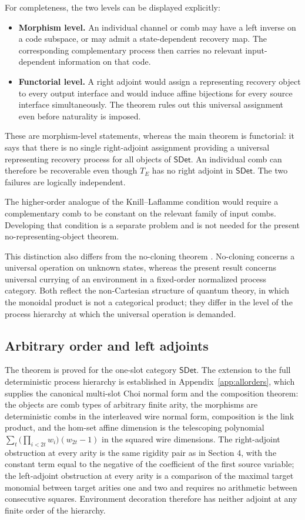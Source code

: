\documentclass[11pt,a4paper]{article}
\theoremstyle{definition}
\theoremstyle{plain}
\theoremstyle{remark}
\newcommand{\SDet}{\mathsf{SDet}}
\begin{document}
For completeness, the two levels can be displayed explicitly:
\begin{itemize}
\item \textbf{Morphism level.} An individual channel or comb may have a left inverse on a code subspace, or may admit a state-dependent recovery map. The corresponding complementary process then carries no relevant input-dependent information on that code.
\item \textbf{Functorial level.} A right adjoint would assign a representing recovery object to every output interface and would induce affine bijections for every source interface simultaneously. The theorem rules out this universal assignment even before naturality is imposed.
\end{itemize}

These are morphism-level statements, whereas the main theorem is functorial: it says that there is no single right-adjoint assignment providing a universal representing recovery process for all objects of $\SDet$. An individual comb can therefore be recoverable even though $T_E$ has no right adjoint in $\SDet$. The two failures are logically independent.

The higher-order analogue of the Knill--Laflamme condition would require a complementary comb to be constant on the relevant family of input combs. Developing that condition is a separate problem and is not needed for the present no-representing-object theorem.

This distinction also differs from the no-cloning theorem \cite{dieks1982,wootters1982}. No-cloning concerns a universal operation on unknown states, whereas the present result concerns universal currying of an environment in a fixed-order normalized process category. Both reflect the non-Cartesian structure of quantum theory, in which the monoidal product is not a categorical product; they differ in the level of the process hierarchy at which the universal operation is demanded.

\subsection{Arbitrary order and left adjoints}

The theorem is proved for the one-slot category $\SDet$. The extension to the full deterministic process hierarchy is established in Appendix~\ref{app:allorders}, which supplies the canonical multi-slot Choi normal form and the composition theorem: the objects are comb types of arbitrary finite arity, the morphisms are deterministic combs in the interleaved wire normal form, composition is the link product, and the hom-set affine dimension is the telescoping polynomial $\sum_t\bigl(\prod_{i<2t}w_i\bigr)(w_{2t}-1)$ in the squared wire dimensions. The right-adjoint obstruction at every arity is the same rigidity pair as in Section 4, with the constant term equal to the negative of the coefficient of the first source variable; the left-adjoint obstruction at every arity is a comparison of the maximal target monomial between target arities one and two and requires no arithmetic between consecutive squares. Environment decoration therefore has neither adjoint at any finite order of the hierarchy.
\end{document}
